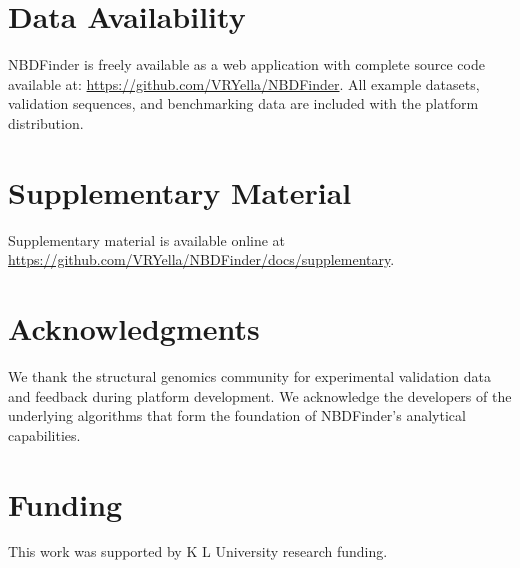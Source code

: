 \documentclass[twocolumn,letterpaper]{article}
\begin{document}
\section{Data Availability}

NBDFinder is freely available as a web application with complete source code available at: \url{https://github.com/VRYella/NBDFinder}. All example datasets, validation sequences, and benchmarking data are included with the platform distribution.

\section{Supplementary Material}

Supplementary material is available online at \url{https://github.com/VRYella/NBDFinder/docs/supplementary}.

\section{Acknowledgments}

We thank the structural genomics community for experimental validation data and feedback during platform development. We acknowledge the developers of the underlying algorithms that form the foundation of NBDFinder's analytical capabilities.

\section{Funding}

This work was supported by K L University research funding.
\end{document}
